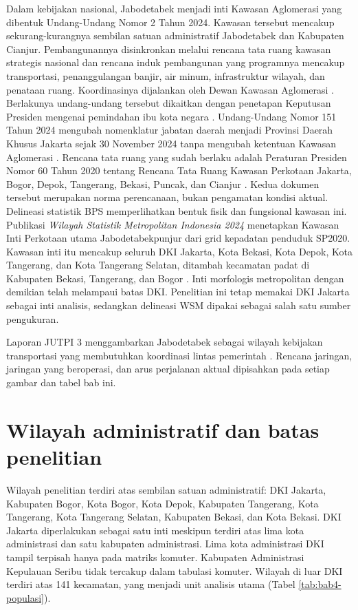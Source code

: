 \documentclass[12pt,a4paper,oneside,openany,indonesian]{report}
\begin{document}
Dalam kebijakan nasional, Jabodetabek menjadi inti Kawasan Aglomerasi yang dibentuk Undang-Undang Nomor 2 Tahun 2024. Kawasan tersebut mencakup sekurang-kurangnya sembilan satuan administratif Jabodetabek dan Kabupaten Cianjur. Pembangunannya disinkronkan melalui rencana tata ruang kawasan strategis nasional dan rencana induk pembangunan yang programnya mencakup transportasi, penanggulangan banjir, air minum, infrastruktur wilayah, dan penataan ruang. Koordinasinya dijalankan oleh Dewan Kawasan Aglomerasi \parencite[Pasal 51--55]{uu22024}. Berlakunya undang-undang tersebut dikaitkan dengan penetapan Keputusan Presiden mengenai pemindahan ibu kota negara \parencite[Pasal 73]{uu22024}. Undang-Undang Nomor 151 Tahun 2024 mengubah nomenklatur jabatan daerah menjadi Provinsi Daerah Khusus Jakarta sejak 30 November 2024 tanpa mengubah ketentuan Kawasan Aglomerasi \parencite{uu1512024}. Rencana tata ruang yang sudah berlaku adalah Peraturan Presiden Nomor 60 Tahun 2020 tentang Rencana Tata Ruang Kawasan Perkotaan Jakarta, Bogor, Depok, Tangerang, Bekasi, Puncak, dan Cianjur \parencite{perpres602020}. Kedua dokumen tersebut merupakan norma perencanaan, bukan pengamatan kondisi aktual.
Delineasi statistik BPS memperlihatkan bentuk fisik dan fungsional kawasan ini. Publikasi \emph{Wilayah Statistik Metropolitan Indonesia 2024} menetapkan Kawasan Inti Perkotaan utama Jabodetabekpunjur dari grid kepadatan penduduk SP2020. Kawasan inti itu mencakup seluruh DKI Jakarta, Kota Bekasi, Kota Depok, Kota Tangerang, dan Kota Tangerang Selatan, ditambah kecamatan padat di Kabupaten Bekasi, Tangerang, dan Bogor \parencite[hlm. 60]{bpswsm2024}. Inti morfologis metropolitan dengan demikian telah melampaui batas DKI. Penelitian ini tetap memakai DKI Jakarta sebagai inti analisis, sedangkan delineasi WSM dipakai sebagai salah satu sumber pengukuran.

Laporan JUTPI 3 menggambarkan Jabodetabek sebagai wilayah kebijakan transportasi yang membutuhkan koordinasi lintas pemerintah \parencite{jica2025jutpi}. Rencana jaringan, jaringan yang beroperasi, dan arus perjalanan aktual dipisahkan pada setiap gambar dan tabel bab ini.

\section{Wilayah administratif dan batas penelitian}

Wilayah penelitian terdiri atas sembilan satuan administratif: DKI Jakarta, Kabupaten Bogor, Kota Bogor, Kota Depok, Kabupaten Tangerang, Kota Tangerang, Kota Tangerang Selatan, Kabupaten Bekasi, dan Kota Bekasi. DKI Jakarta diperlakukan sebagai satu inti meskipun terdiri atas lima kota administrasi dan satu kabupaten administrasi. Lima kota administrasi DKI tampil terpisah hanya pada matriks komuter. Kabupaten Administrasi Kepulauan Seribu tidak tercakup dalam tabulasi komuter. Wilayah di luar DKI terdiri atas 141 kecamatan, yang menjadi unit analisis utama (Tabel \ref{tab:bab4-populasi}).
\end{document}
